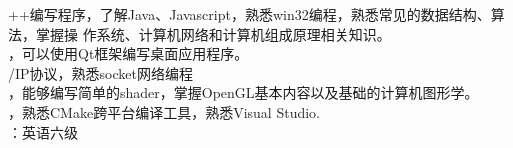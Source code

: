 \documentclass{resume} %
\begin{document}

\begin{rSection}{}


++编写程序，了解Java、Javascript，熟悉win32编程，熟悉常见的数据结构、算法，掌握操
作系统、计算机网络和计算机组成原理相关知识。\\
，可以使用Qt框架编写桌面应用程序。\\
/IP协议，熟悉socket网络编程\\
，能够编写简单的shader，掌握OpenGL基本内容以及基础的计算机图形学。\\
，熟悉CMake跨平台编译工具，熟悉Visual Studio. \\
：英语六级 

\end{rSection}

\end{document}
